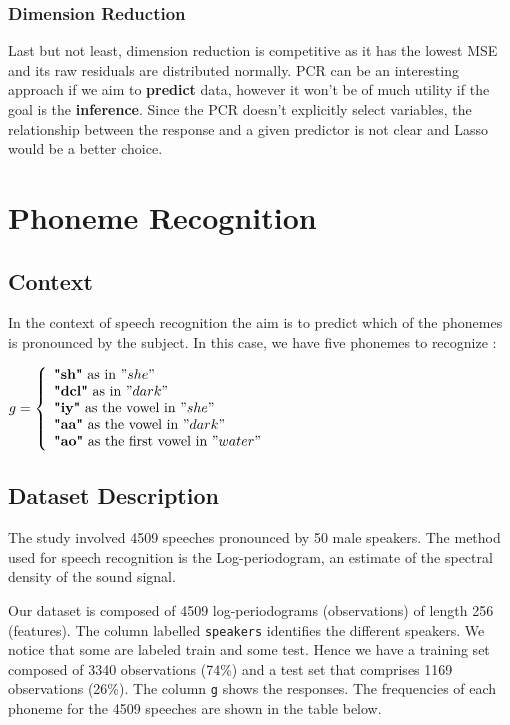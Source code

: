 \documentclass[]{report}
\begin{document}
\subsection{Dimension Reduction}
Last but not least, dimension reduction is competitive as it has the lowest MSE and its raw residuals are distributed normally. PCR can be an interesting approach if we aim to \textbf{predict} data, however it won't be of much utility if the goal is the \textbf{inference}. Since the PCR doesn't explicitly select variables, the relationship between the response and a given predictor is not clear and Lasso would be a better choice. 


\chapter{Phoneme Recognition}
\section{Context}
In the context of speech recognition the aim is to predict which of the phonemes is pronounced by the subject. In this case, we have five phonemes to recognize :\\ 
\begin{center}
	$g = \left\{
	\begin{array}{l}
	\textbf{"sh"} \text{ as in } "she" \\
	\textbf{"dcl"} \text{ as in } "dark" \\
	\textbf{"iy"} \text{ as the vowel in } "she" \\ 
	\textbf{"aa"} \text{ as the vowel in }  "dark"\\
	\textbf{"ao"} \text{ as the first vowel in }  "water"
	\end{array}
	\right.$
\end{center}

\section{Dataset Description}

The study involved 4509 speeches pronounced by 50 male speakers. The method used for speech recognition is the Log-periodogram, an estimate of the spectral density of the sound signal.

Our dataset is composed of 4509 log-periodograms (observations) of length 256 (features). The column labelled \texttt{speakers} identifies the different speakers. We notice that some are labeled train and some test. Hence we have a training set composed of 3340 observations (74\%) and a test set that comprises 1169 observations (26\%). The column \texttt{g} shows the responses. The frequencies of each phoneme for the 4509 speeches are shown in the table below.
\end{document}
